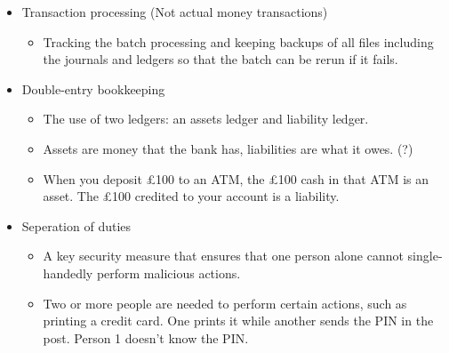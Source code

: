 \documentclass[12pt]{report}
\begin{document}
\begin{itemize}
\begin{itemize}
	\end{itemize}
	\item Transaction processing \footnotesize{(Not actual money transactions)}\normalsize
	\begin{itemize}
		\item Tracking the batch processing and keeping backups of all files including the journals and ledgers so that the batch can be rerun if it fails.
	\end{itemize}
	\item Double-entry bookkeeping
	\begin{itemize}
		\item The use of two ledgers: an assets ledger and liability ledger.
		\item Assets are money that the bank has, liabilities are what it owes. (?)
		\item \footnotesize When you deposit £100 to an ATM, the £100 cash in that ATM is an asset. The £100 credited to your account is a liability.
	\end{itemize}
	\item Seperation of duties
	\begin{itemize}
		\item A key security measure that ensures that one person alone cannot single-handedly perform malicious actions.
		\item Two or more people are needed to perform certain actions, such as printing a credit card. One prints it while another sends the PIN in the post. Person 1 doesn't know the PIN.
	\end{itemize}
\end{itemize}
\end{document}
